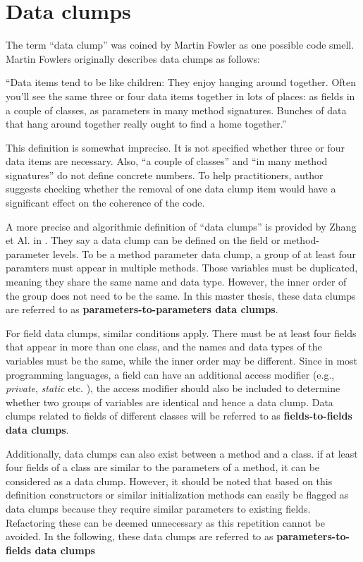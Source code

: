 \section{Data clumps}\label{sec:data_clump_def}
The term \enquote{data clump} was coined by Martin Fowler as one possible code smell. 
Martin Fowlers originally describes data clumps as follows:

\begin{displayquote}
\enquote{Data items tend to be like children: They enjoy hanging around together. Often you'll see
the same three or four data items together in lots of
places: as fields in a couple of classes, as parameters in many
method signatures. Bunches of data that hang around together really ought to find a home together.} \cite{fowler2019refactoring} 
\end{displayquote}


This definition is somewhat imprecise. It is not specified whether three or four data items are necessary. Also, \enquote{a couple of classes} and \enquote{in many method signatures} do not define concrete numbers. To help practitioners,   author suggests checking whether the removal of one data clump item would have a significant effect on the coherence of the code.

A more precise and algorithmic definition of \enquote{data clumps} is provided by Zhang et Al. in  \cite{zhangImprovingPrecisionFowler2008}. They say a data clump can be defined on the field or method-parameter levels. 
To be a method parameter data clump, a group of at least four paramters must appear in multiple methods. Those variables must be duplicated, meaning they share the same name and data type. However, the inner order of the group does not need to be the same. In this master thesis, these data clumps are referred to as \textbf{parameters-to-parameters data clumps}.

For field data clumps, similar conditions apply. There must be at least four fields that appear in more than one class, and the names and data types of the variables must be the same, while the inner order may be different. Since in most programming languages, a field can have an additional access modifier (e.g., \textit{private}, \textit{static} etc. ), the access modifier should also be included to determine whether two groups of variables are identical and hence a data clump.  Data clumps related to fields of different classes will be referred to as \textbf{fields-to-fields data clumps}.

Additionally, data clumps can also exist between a method and a class. if at least four fields of a class are similar to the parameters of a method, it can be considered as a data clump. However, it should be noted that based on this definition constructors or similar initialization methods can easily be flagged as data clumps because they require similar parameters to existing fields. Refactoring these can be deemed unnecessary as this repetition cannot be avoided. 
 In the following, these data clumps are referred to as \textbf{parameters-to-fields data clumps}


